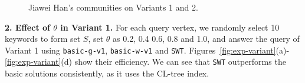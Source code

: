 {\begin{figure}[ht]
{{            \label{fig:jiawei-v1-2}
        }
    }
    \caption{Jiawei Han's communities on Variants 1 and 2.}\label{fig:jiawei-v1}
\end{figure}




\textbf{2. Effect of $\theta$ in Variant 1.}
For each query vertex, we randomly select 10 keywords to form set $S$, set $\theta$ as 0.2, 0.4 0.6, 0.8 and 1.0,
and answer the query of Variant 1 using {\tt basic-g-v1}, {\tt basic-w-v1} and {\tt SWT}.
Figures~\ref{fig:exp-variant}(a)-\ref{fig:exp-variant}(d) show their efficiency.
We can see that {\tt SWT} outperforms the basic solutions consistently, as it uses the CL-tree index. 


}